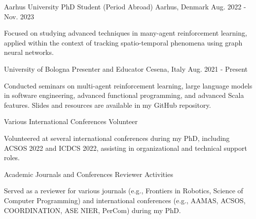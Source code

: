 
\begin{cventries}

  \cventry
    {Aarhus University} %
    {PhD Student (Period Abroad)} %
    {Aarhus, Denmark} %
    {Aug. 2022 - Nov. 2023} %
    {
      \begin{cvitems} %
        \item {Focused on studying advanced techniques in many-agent reinforcement learning, applied within the context of tracking spatio-temporal phenomena using graph neural networks.}
      \end{cvitems}
    }
  \cventry
    {University of Bologna} %
    {Presenter and Educator} %
    {Cesena, Italy} %
    {Aug. 2021 - Present} %
    {
      \begin{cvitems} %
        \item {Conducted seminars on multi-agent reinforcement learning, large language models in software engineering, advanced functional programming, and advanced Scala features. Slides and resources are available in my GitHub repository.}
      \end{cvitems}
    }
  \cventry
    {Various International Conferences} %
    {Volunteer} %
    {} %
    {} %
    {
      \begin{cvitems} %
        \item {Volunteered at several international conferences during my PhD, including ACSOS 2022 and ICDCS 2022, assisting in organizational and technical support roles.}
      \end{cvitems}
    }
  \cventry
    {Academic Journals and Conferences} %
    {Reviewer Activities} %
    {} %
    {} %
    {
      \begin{cvitems} %
        \item {Served as a reviewer for various journals (e.g., Frontiers in Robotics, Science of Computer Programming) and international conferences (e.g., AAMAS, ACSOS, COORDINATION, ASE NIER, PerCom) during my PhD.}
      \end{cvitems}
    }
\end{cventries}

